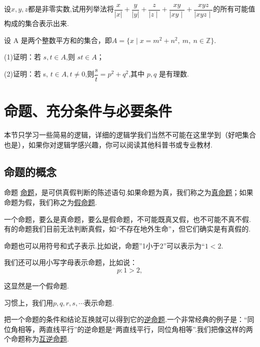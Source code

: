 \documentclass[lang=cn,math=cm,chinesefont=nofont,11pt,scheme=chinese,twocol]{elegantbook}
\begin{document}
\begin{exercise}\label{exer:17}
  设$x,y,z$都是非零实数,试用列举法将$\dfrac x{|x|}+\dfrac y{|y|}+{\dfrac{z}{\mid z\mid}}+{\dfrac{xy}{\mid xy\mid}}+{\dfrac{xyz}{\mid xyz\mid}}$的所有可能值构成的集合表示出来.
\end{exercise}

\begin{exercise}\label{exer:18}
  设 A 是两个整数平方和的集合，即$A=\{x\mid x=m^2+n^2,\:m,\:n\in\mathbb{Z}\}.$

(1)证明：若 $s,t{\in}A$,则 $st{\in}A$；

(2)证明：若 s, $t\in A,t\neq0$,则$\dfrac st=p^2+q^2$,其中 $p,q$ 是有理数.
\end{exercise}

\section{命题、充分条件与必要条件}
本节只学习一些简易的逻辑，详细的逻辑学我们当然不可能在这里学到（好吧集合也是），如果你对逻辑学感兴趣，你可以阅读其他科普书或专业教材.

\subsection{命题的概念}

\begin{definition}{命题}
  \underline{命题}，是可供真假判断的陈述语句.如果命题为真，我们称之为\underline{真命题}；如果命题为假，我们称之为\underline{假命题}.
\end{definition}

\begin{remark}
  一个命题，要么是真命题，要么是假命题，不可能既真又假，也不可能不真不假.有的命题我们目前无法判断真假，如“不存在地外生命”，但它们确实是有真假的.
\end{remark}

命题也可以用符号和式子表示.比如说，命题”1小于2”可以表示为“$1<2$.

我们还可以用小写字母表示命题，比如说：$$p:1>2,$$

这显然是一个假命题.

习惯上，我们用$p,q,r,s,\cdots$表示命题.

\hspace*{\fill}

把一个命题的条件和结论互换就可以得到它的\underline{逆命题}.一个非常经典的例子是：“同位角相等，两直线平行”的逆命题是“两直线平行，同位角相等”.我们把像这样的两个命题称为\underline{互逆命题}.
\end{document}
